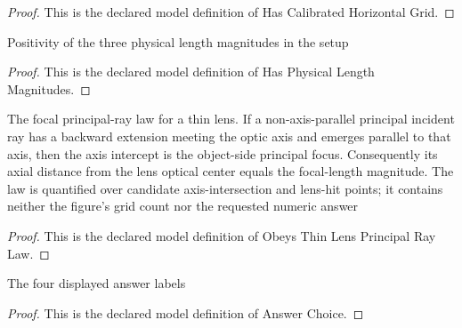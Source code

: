 \begin{proof}
  This is the declared model definition of Has Calibrated Horizontal Grid.
\end{proof}
\begin{definition}
  \label{def:physics:phyx-mini-0109:phyxminiproblems-problemphyxmini0109-hasphysicallengthmagnitudes}
  Positivity of the three physical length magnitudes in the setup
\end{definition}
\begin{proof}
  This is the declared model definition of Has Physical Length Magnitudes.
\end{proof}
\begin{definition}
  \label{def:physics:phyx-mini-0109:phyxminiproblems-problemphyxmini0109-obeysthinlensprincipalraylaw}
  The focal principal-ray law for a thin lens. If a non-axis-parallel principal incident ray has a backward extension meeting the optic axis and emerges parallel to that axis, then the axis intercept is the object-side principal focus. Consequently its axial distance from the lens optical center equals the focal-length magnitude. The law is quantified over candidate axis-intersection and lens-hit points; it contains neither the figure's grid count nor the requested numeric answer
\end{definition}
\begin{proof}
  This is the declared model definition of Obeys Thin Lens Principal Ray Law.
\end{proof}
\begin{definition}
  \label{def:physics:phyx-mini-0109:phyxminiproblems-problemphyxmini0109-answerchoice}
  The four displayed answer labels
\end{definition}
\begin{proof}
  This is the declared model definition of Answer Choice.
\end{proof}
